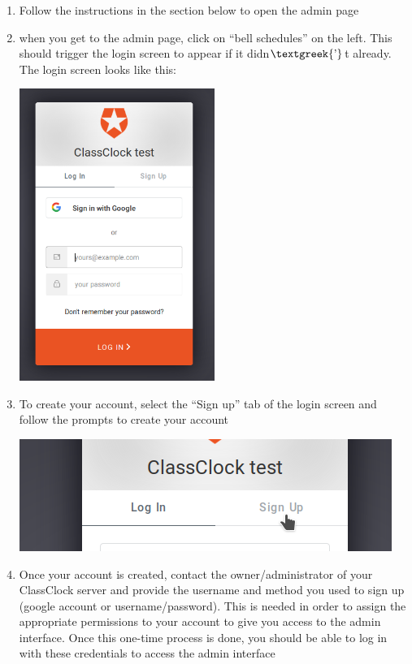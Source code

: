 \documentclass{article}
\begin{document}
\begin{enumerate}
\item {Follow the instructions in the section below to open the admin page}
\item {when you get to the admin page, click on “bell schedules” on the left. This should trigger the login screen to appear if
it didn$\text{\textgreek{’}}$t already. The login screen looks like this:
}
\begin{center}
\includegraphics[width=0.5\textwidth]{Mini20Manual-img005.png}
\end{center}
\item {To create your account, select the “Sign up” tab of the login screen and follow the prompts to create your account}
\begin{center}
\includegraphics[width=4.7701in,height=1.4366in]{Mini20Manual-img006.png}
\end{center}

\item {Once your account is created, contact the owner/administrator of your ClassClock server and provide the username and
method you used to sign up (google account or username/password). This is needed in order to assign the appropriate
permissions to your account to give you access to the admin interface. Once this one-time process is done, you should
be able to log in with these credentials to access the admin interface}
\end{enumerate}
\end{document}

